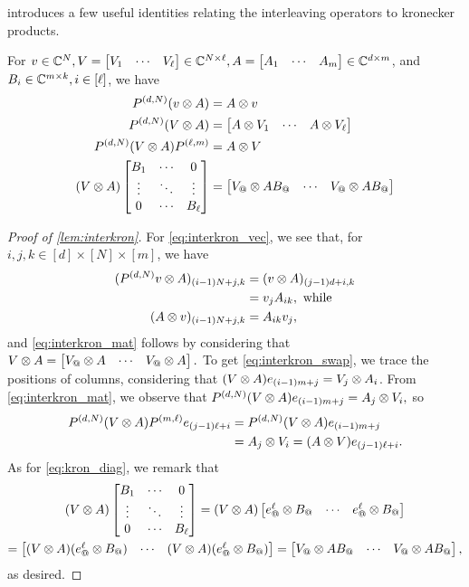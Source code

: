  introduces a few useful identities relating the interleaving operators to kronecker products.

\begin{lemma}
  For $v \in \mathbb{C}^N, V = \begin{bmatrix} V_{1} & \cdots & V_{\ell} \end{bmatrix} \in \mathbb{C}^{N \times \ell}, A = \begin{bmatrix} A_{1} & \cdots & A_{m} \end{bmatrix} \in \mathbb{C}^{d \times m}$, and $B_i \in \mathbb{C}^{m \times k}, i \in [\ell]$, we have
  \begin{align}
    P^{(d, N)} (v \kron A) &= A \kron v
    \label{eq:interkron_vec} \\
    P^{(d, N)} (V \kron A) &= \rowmat{A \kron V}{1}{\ell}
    \label{eq:interkron_mat} \\
    P^{(d, N)} (V \kron A) P^{(\ell, m)} &= A \kron V
    \label{eq:interkron_swap} \\
    (V \kron A) \diagmat{B}{1}{\ell} &= \rowmatfun{V_@ \kron A B_@}{1}{\ell}
    \label{eq:kron_diag}
  \end{align}
  \label{lem:interkron}
\end{lemma}

\begin{proof}[Proof of \cref{lem:interkron}]
  For \eqref{eq:interkron_vec}, we see that, for $i, j, k \in [d] \times [N] \times [m]$, we have
  \begin{align*}
    (P^{(d, N)} v \otimes A)_{(i - 1) N + j, k} &= (v \otimes A)_{(j - 1) d + i, k} \\
    &= v_j A_{i k}, \ \text{while} \\
    (A \otimes v)_{(i - 1) N + j, k} &= A_{i k} v_j,
  \end{align*}
  and \eqref{eq:interkron_mat} follows by considering that $V \otimes A = \rowmatfun{V_@ \kron A}{1}{\ell}.$  To get \eqref{eq:interkron_swap}, we trace the positions of columns, considering that $(V \otimes A) e_{(i - 1) m + j} = V_j \otimes A_i$.  From \eqref{eq:interkron_mat}, we observe that $P^{(d, N)} (V \otimes A) e_{(i - 1) m + j} = A_j \otimes V_i,$ so \begin{align*}
    P^{(d, N)} (V \otimes A) P^{(m, \ell)} e_{(j - 1) \ell + i} &= P^{(d, N)} (V \otimes A) e_{(i - 1) m + j} \\
    &= A_j \otimes V_i = (A \otimes V) e_{(j - 1) \ell + i}.
  \end{align*}
 As for \eqref{eq:kron_diag}, we remark that \begin{gather*} (V \kron A) \diagmat{B}{1}{\ell}%
    = (V \kron A) \rowmatfun{e^\ell_@ \kron B_@}{1}{\ell}  \\ = \rowmatfun{(V \kron A) (e_@^\ell \kron B_@)}{1}{\ell} = \rowmatfun{V_@ \kron A B_@}{1}{\ell},\end{gather*} as desired.
\end{proof}

